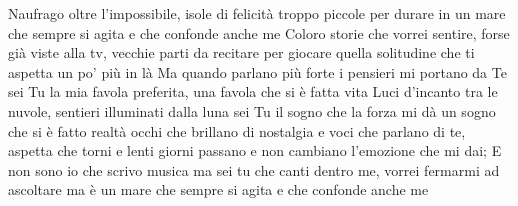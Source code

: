 \beginverse
Naufrago oltre l'impossibile,
isole di felicità
troppo piccole per durare
in un mare che sempre si agita
e che confonde anche me
Coloro storie che vorrei sentire,
forse già viste alla tv,
vecchie parti da recitare
per giocare quella solitudine
che ti aspetta un po' più in là
\endverse
\beginchorus
Ma quando parlano più forte
i pensieri mi portano da Te
sei Tu la mia favola preferita,
una favola che si è fatta vita
\endchorus
\beginverse
Luci d'incanto tra le nuvole,
sentieri illuminati dalla luna
sei Tu il sogno che la forza mi dà
un sogno che si è fatto realtà
occhi che brillano di nostalgia
e voci che parlano di te,
aspetta che torni e lenti giorni passano
e non cambiano l'emozione che mi dai;
E non sono io che scrivo musica
ma sei tu che canti dentro me,
vorrei fermarmi ad ascoltare
ma è un mare che sempre si agita
e che confonde anche me
\endverse
\endsong
